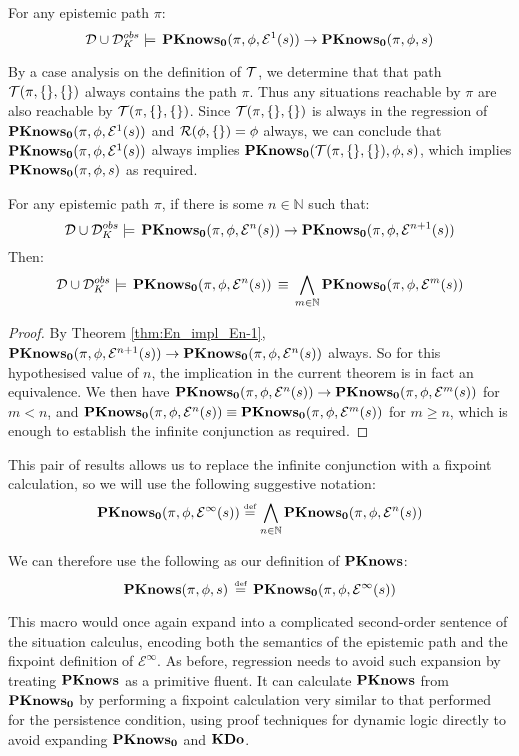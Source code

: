 \begin{thm}
\label{thm:En_impl_En-1}For any epistemic path $\pi$: \[
\mathcal{D}\cup\mathcal{D}_{K}^{obs}\models\,\mathbf{PKnows_{0}}(\pi,\phi,\mathcal{E}^{1}(s))\rightarrow\mathbf{PKnows_{0}}(\pi,\phi,s)\]

\end{thm}
\begin{proofsketch}
By a case analysis on the definition of $\mathcal{T}$, we determine that
that path $\mathcal{T}(\pi,\{\},\{\})$ always contains the path $\pi$.
Thus any situations reachable by $\pi$ are also reachable by $\mathcal{T}(\pi,\{\},\{\})$.
Since $\mathcal{T}(\pi,\{\},\{\})$ is always in the regression of $\mathbf{PKnows_{0}}(\pi,\phi,\mathcal{E}^{1}(s))$
and $\mathcal{R}(\phi,\{\})=\phi$ always, we can conclude that $\mathbf{PKnows_{0}}(\pi,\phi,\mathcal{E}^{1}(s))$
always implies $\mathbf{PKnows_{0}}(\mathcal{T}(\pi,\{\},\{\}),\phi,s)$, which implies
$\mathbf{PKnows_{0}}(\pi,\phi,s)$ as required. 
\end{proofsketch}
\begin{thm}
For any epistemic path $\pi$, if there is some $n\in\mathbb{N}$
such that:\[
\mathcal{D}\cup\mathcal{D}_{K}^{obs}\models\,\mathbf{PKnows_{0}}(\pi,\phi,\mathcal{E}^{n}(s))\rightarrow\mathbf{PKnows_{0}}(\pi,\phi,\mathcal{E}^{n+1}(s))\]
 Then:\[
\mathcal{D}\cup\mathcal{D}_{K}^{obs}\models\,\mathbf{PKnows_{0}}(\pi,\phi,\mathcal{E}^{n}(s))\,\equiv\,\bigwedge_{m\in\mathbb{N}}\mathbf{PKnows_{0}}(\pi,\phi,\mathcal{E}^{m}(s))\]

\end{thm}
\begin{proof}
By Theorem \ref{thm:En_impl_En-1}, $\mathbf{PKnows_{0}}(\pi,\phi,\mathcal{E}^{n+1}(s))\rightarrow\mathbf{PKnows_{0}}(\pi,\phi,\mathcal{E}^{n}(s))$
always. So for this hypothesised value of $n$, the implication in
the current theorem is in fact an equivalence. We then have $\mathbf{PKnows_{0}}(\pi,\phi,\mathcal{E}^{n}(s))\rightarrow\mathbf{PKnows_{0}}(\pi,\phi,\mathcal{E}^{m}(s))$
for $m<n$, and $\mathbf{PKnows_{0}}(\pi,\phi,\mathcal{E}^{n}(s))\equiv\mathbf{PKnows_{0}}(\pi,\phi,\mathcal{E}^{m}(s))$
for $m\geq n$, which is enough to establish the infinite conjunction
as required. 
\end{proof}
This pair of results allows us to replace the infinite conjunction
with a fixpoint calculation, so we will use the following suggestive
notation:\[
\mathbf{PKnows_{0}}(\pi,\phi,\mathcal{E}^{\infty}(s))\stackrel{\mbox{\tiny def}}{=}\bigwedge_{n\in\mathbb{N}}\mathbf{PKnows_{0}}(\pi,\phi,\mathcal{E}^{n}(s))\]


We can therefore use the following as our definition of $\mathbf{PKnows}$:\[
\mathbf{PKnows}(\pi,\phi,s)\,\stackrel{\mbox{\tiny def}}{=}\,\mathbf{PKnows_{0}}(\pi,\phi,\mathcal{E}^{\infty}(s))\]


This macro would once again expand into a complicated second-order
sentence of the situation calculus, encoding both the semantics of
the epistemic path and the fixpoint definition of $\mathcal{E}^{\infty}$.
As before, regression needs to avoid such expansion by treating $\mathbf{PKnows}$
as a primitive fluent. It can calculate $\mathbf{PKnows}$ from $\mathbf{PKnows_{0}}$
by performing a fixpoint calculation very similar to that performed
for the persistence condition, using proof techniques for dynamic
logic directly to avoid expanding $\mathbf{PKnows_{0}}$ and $\mathbf{KDo}$.

